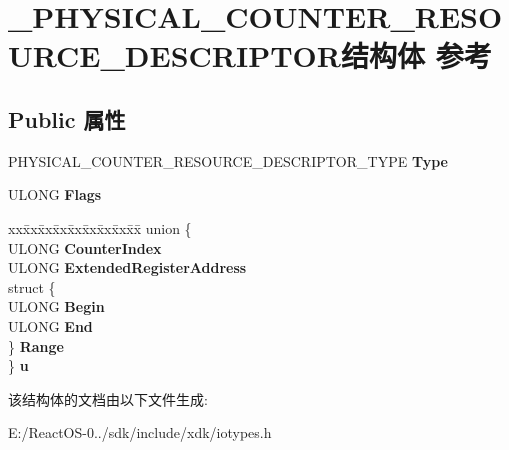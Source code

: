 \hypertarget{struct___p_h_y_s_i_c_a_l___c_o_u_n_t_e_r___r_e_s_o_u_r_c_e___d_e_s_c_r_i_p_t_o_r}{}\section{\+\_\+\+P\+H\+Y\+S\+I\+C\+A\+L\+\_\+\+C\+O\+U\+N\+T\+E\+R\+\_\+\+R\+E\+S\+O\+U\+R\+C\+E\+\_\+\+D\+E\+S\+C\+R\+I\+P\+T\+O\+R结构体 参考}
\label{struct___p_h_y_s_i_c_a_l___c_o_u_n_t_e_r___r_e_s_o_u_r_c_e___d_e_s_c_r_i_p_t_o_r}
\subsection*{Public 属性}
\begin{DoxyCompactItemize}
\item 
\mbox{\label{struct___p_h_y_s_i_c_a_l___c_o_u_n_t_e_r___r_e_s_o_u_r_c_e___d_e_s_c_r_i_p_t_o_r_a2247efb7a8b359d0eabcb140621804ca}} 
P\+H\+Y\+S\+I\+C\+A\+L\+\_\+\+C\+O\+U\+N\+T\+E\+R\+\_\+\+R\+E\+S\+O\+U\+R\+C\+E\+\_\+\+D\+E\+S\+C\+R\+I\+P\+T\+O\+R\+\_\+\+T\+Y\+PE {\bfseries Type}
\item 
\mbox{\label{struct___p_h_y_s_i_c_a_l___c_o_u_n_t_e_r___r_e_s_o_u_r_c_e___d_e_s_c_r_i_p_t_o_r_a3a43defad4f3c68a291199fdd812574f}} 
U\+L\+O\+NG {\bfseries Flags}
\item 
\mbox{\label{struct___p_h_y_s_i_c_a_l___c_o_u_n_t_e_r___r_e_s_o_u_r_c_e___d_e_s_c_r_i_p_t_o_r_a2a5e2457efcd86abef860e07f1417d4e}} 
\begin{tabbing}
xx\=xx\=xx\=xx\=xx\=xx\=xx\=xx\=xx\=\kill
union \{\\
\>ULONG {\bfseries CounterIndex}\\
\>ULONG {\bfseries ExtendedRegisterAddress}\\
\>struct \{\\
\>\>ULONG {\bfseries Begin}\\
\>\>ULONG {\bfseries End}\\
\>\} {\bfseries Range}\\
\} {\bfseries u}\\

\end{tabbing}\end{DoxyCompactItemize}


该结构体的文档由以下文件生成\+:\begin{DoxyCompactItemize}
\item 
E\+:/\+React\+O\+S-\/0../sdk/include/xdk/iotypes.\+h\end{DoxyCompactItemize}
